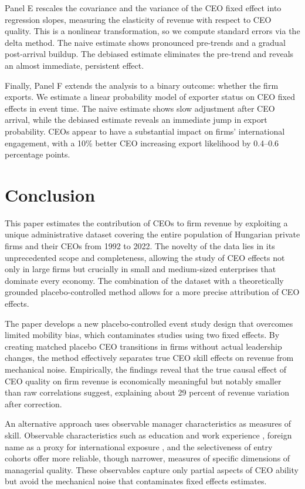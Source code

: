 \documentclass[11pt,a4paper]{article}
\begin{document}
Panel E rescales the covariance and the variance of the CEO fixed effect into regression slopes, measuring the elasticity of revenue with respect to CEO quality. This is a nonlinear transformation, so we compute standard errors via the delta method. The naive estimate shows pronounced pre-trends and a gradual post-arrival buildup. The debiased estimate eliminates the pre-trend and reveals an almost immediate, persistent effect.

Finally, Panel F extends the analysis to a binary outcome: whether the firm exports. We estimate a linear probability model of exporter status on CEO fixed effects in event time. The naive estimate shows slow adjustment after CEO arrival, while the debiased estimate reveals an immediate jump in export probability. CEOs appear to have a substantial impact on firms' international engagement, with a 10\% better CEO increasing export likelihood by 0.4--0.6 percentage points.


\section{Conclusion}

This paper estimates the contribution of CEOs to firm revenue by exploiting a unique administrative dataset covering the entire population of Hungarian private firms and their CEOs from 1992 to 2022. The novelty of the data lies in its unprecedented scope and completeness, allowing the study of CEO effects not only in large firms but crucially in small and medium-sized enterprises that dominate every economy. The combination of the dataset with a theoretically grounded placebo-controlled method allows for a more precise attribution of CEO effects. 

The paper develops a new placebo-controlled event study design that overcomes limited mobility bias, which contaminates studies using two fixed effects.  By creating matched placebo CEO transitions in firms without actual leadership changes, the method effectively separates true CEO skill effects on revenue from mechanical noise. Empirically, the findings reveal that the true causal effect of CEO quality on firm revenue is economically meaningful but notably smaller than raw correlations suggest, explaining about 29 percent of revenue variation after correction. 

An alternative approach uses observable manager characteristics as measures of skill. Observable characteristics such as education and work experience \citep{DePirro2025}, foreign name as a proxy for international exposure \citep{Koren2023expat}, and the selectiveness of entry cohorts \citep{koren2024managers} offer more reliable, though narrower, measures of specific dimensions of managerial quality. These observables capture only partial aspects of CEO ability but avoid the mechanical noise that contaminates fixed effects estimates.
\end{document}
